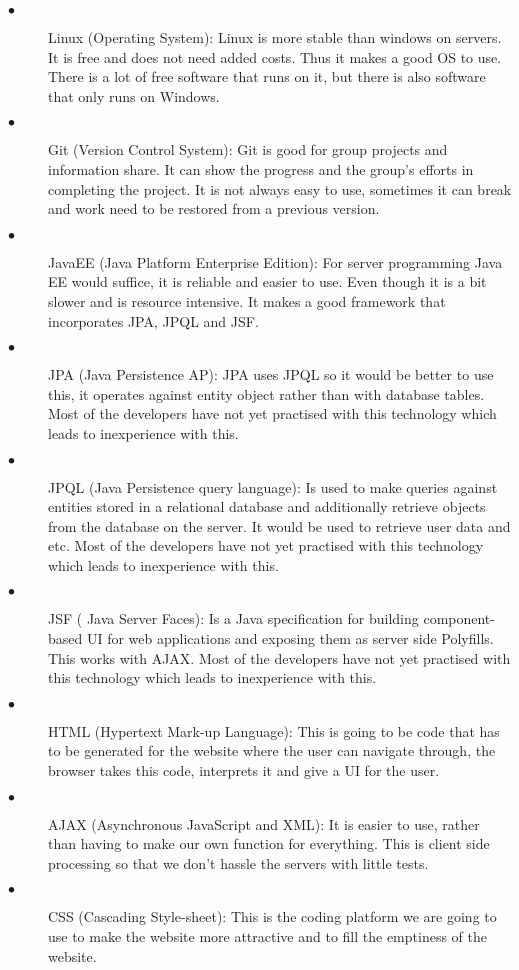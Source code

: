 \documentclass[12pt]{article}
\begin{document}
\begin{description}
  \item[$\bullet$] Linux (Operating System):
  Linux is more stable than windows on servers. It is free and does not need added costs. Thus it makes a good OS to use. There is a lot of free software that runs on it, but there is also software that only runs on Windows. 
  
  \item[$\bullet$] Git (Version Control System):
  Git is good for group projects and information share. It can show the progress and the group’s efforts in completing the project. It is not always easy to use, sometimes it can break and work need to be restored from a previous version.
  
  \item[$\bullet$] JavaEE (Java Platform Enterprise Edition):
  For server programming Java EE would suffice, it is reliable and easier to use. Even though it is a bit slower and is resource intensive. It makes a good framework that incorporates JPA,  JPQL and JSF.
  
  \item[$\bullet$]JPA (Java Persistence AP):
  JPA uses JPQL so it would be better to use this, it operates against entity object rather than with database tables. Most of the developers have not yet practised with this technology which leads to inexperience with this. 
  
  \item[$\bullet$] JPQL (Java Persistence query language):
  Is used to make queries against entities stored in a relational database and additionally retrieve objects from the database on the server. It would be used to retrieve user data and etc. Most of the developers have not yet practised with this technology which leads to inexperience with this. 
  
  \item[$\bullet$] JSF ( Java Server Faces):
  Is a Java specification for building component-based UI for web applications and exposing them as server side Polyfills. This works with AJAX. Most of the developers have not yet practised with this technology which leads to inexperience with this. 
  
  \item[$\bullet$] HTML (Hypertext Mark-up Language):
  This is going to be code that has to be generated for the website where the user can navigate through, the browser takes this code, interprets it and give a UI for the user. 
  
  \item[$\bullet$] AJAX (Asynchronous JavaScript and XML):
  It is easier to use, rather than having to make our own function for everything. This is client side processing so that we don’t hassle the servers with little tests.
  
  \item[$\bullet$] CSS (Cascading Style-sheet):
  This is the coding platform we are going to use to make the website more attractive and to fill the emptiness of the website.
\end{description}
\end{document}
